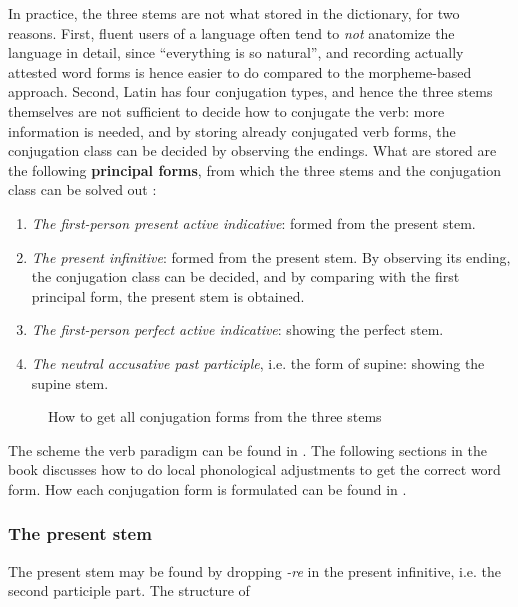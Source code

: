 \documentclass{article}
\newcommand*{\citesec}[1]{\S~{#1}}
\newcommand*{\concept}[1]{\textbf{#1}}
\newcommand*{\corpus}[1]{\emph{#1}}
\begin{document}
In practice, the three stems are not what stored in the dictionary,
for two reasons.
First, fluent users of a language often 
tend to \emph{not} anatomize the language in detail,
since ``everything is so natural'', 
and recording actually attested word forms is hence easier to do
compared to the morpheme-based approach.
Second, Latin has four conjugation types,
and hence the three stems themselves are not sufficient to decide how to conjugate the verb:
more information is needed, 
and by storing already conjugated verb forms,
the conjugation class can be decided by observing the endings.
What are stored are the following \concept{principal forms},
from which the three stems and the conjugation class can be solved out
\citep[\citesec{172}]{allen1903allen}:
\begin{enumerate}
    \item \emph{The first-person present active indicative}: formed from the present stem.
    \item \emph{The present infinitive}: formed from the present stem. 
    By observing its ending, the conjugation class can be decided,
    and by comparing with the first principal form, 
    the present stem is obtained.
    \item \emph{The first-person perfect active indicative}: showing the perfect stem.
    \item \emph{The neutral accusative past participle}, i.e. the form of supine: showing the supine stem.
\end{enumerate}

\begin{sidewaysfigure}
    \centering
    
    \caption{How to get all conjugation forms from the three stems}
    \label{fig:stem-to-form}
\end{sidewaysfigure}

The scheme the verb paradigm can be found in \citep[\citesec{166}]{allen1903allen}.
The following sections in the book discusses how to do local phonological adjustments 
to get the correct word form.
How each conjugation form is formulated can be found in \citep[\citesec{180}]{allen1903allen}.

\subsubsection{The present stem}

The present stem may be found by dropping \corpus{-re} in the present infinitive, 
i.e. the second participle part.
The structure of 
\end{document}
